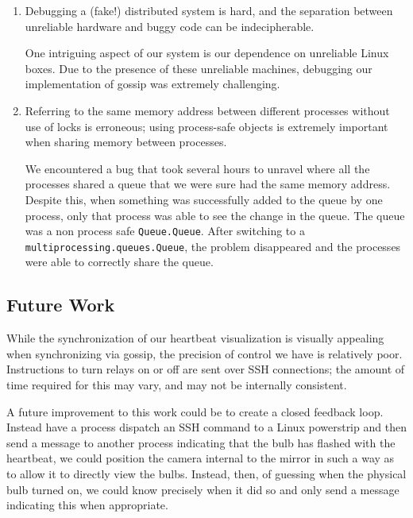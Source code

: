 \documentclass[preprint,review,12pt]{cs262}
\begin{document}
\begin{enumerate}
\item Debugging a (fake!) distributed system is hard, and the separation between unreliable hardware and buggy code can be indecipherable. 

One intriguing aspect of our system is our dependence on unreliable Linux boxes. Due to the presence of these unreliable machines, debugging our implementation of gossip was extremely challenging. 

\item Referring to the same memory address between different processes without use of locks is erroneous; using process-safe objects is extremely important when sharing memory between processes.

We encountered a bug that took several hours to unravel where all the processes shared a queue that we were sure had the same memory address. Despite this, when something was successfully added to the queue by one process, only that process was able to see the change in the queue. The queue was a non process safe \texttt{Queue.Queue}. After switching to a \texttt{multiprocessing.queues.Queue}, the problem disappeared and the processes were able to correctly share the queue.
\end{enumerate}

\subsection{Future Work} 

While the synchronization of our heartbeat visualization is visually appealing when synchronizing via gossip, the precision of control we have is relatively poor. Instructions to turn relays on or off are sent over SSH connections; the amount of time required for this may vary, and may not be internally consistent. 

A future improvement to this work could be to create a closed feedback loop. Instead have a process dispatch an SSH command to a Linux powerstrip and then send a message to another process indicating that the bulb has flashed with the heartbeat, we could position the camera internal to the mirror in such a way as to allow it to directly view the bulbs. Instead, then, of guessing when the physical bulb turned on, we could know precisely when it did so and only send a message indicating this when appropriate. 

\end{document}
